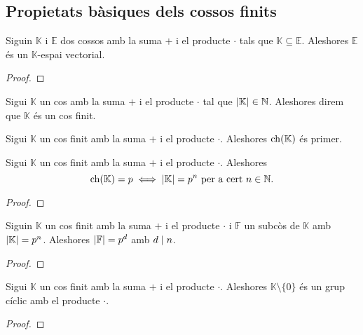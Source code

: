\documentclass[../Apunts.tex]{subfiles}
\begin{document}
	\subsection{Propietats bàsiques dels cossos finits}
	\begin{proposition}
		Siguin \(\mathbb{K}\) i \(\mathbb{E}\) dos cossos amb la suma \(+\) i el producte \(\cdot\) tals que \(\mathbb{K}\subseteq\mathbb{E}\). Aleshores \(\mathbb{E}\) és un \(\mathbb{K}\)-espai vectorial.
		\begin{proof}
		\end{proof}
	\end{proposition}
	\begin{definition}
		\label{def:cos finit}
		Sigui \(\mathbb{K}\) un cos amb la suma \(+\) i el producte \(\cdot\) tal que \(\abs{\mathbb{K}}\in\mathbb{N}\). Aleshores direm que \(\mathbb{K}\) és un cos finit.
	\end{definition}
	\begin{observation}
		Sigui \(\mathbb{K}\) un cos finit amb la suma \(+\) i el producte \(\cdot\). Aleshores \(\operatorname{ch}(\mathbb{K})\) és primer.
	\end{observation}
	\begin{theorem}
		Sigui \(\mathbb{K}\) un cos finit amb la suma \(+\) i el producte \(\cdot\). Aleshores
		\[\ch(\mathbb{K})=p\sii\abs{\mathbb{K}}=p^{n}\text{ per a cert }n\in\mathbb{N}.\]
		\begin{proof}
		\end{proof}
	\end{theorem}
	\begin{corollary}
		Siguin \(\mathbb{K}\) un cos finit amb la suma \(+\) i el producte \(\cdot\) i \(\mathbb{F}\) un subcòs de \(\mathbb{K}\) amb \(\abs{\mathbb{K}}=p^{n}\). Aleshores \(\abs{\mathbb{F}}=p^{d}\) amb \(d\mathrel{|} n\).
		\begin{proof}
		\end{proof}
	\end{corollary}
	\begin{theorem}
		\label{thm:teorema de l'element primitiu}
		Sigui \(\mathbb{K}\) un cos finit amb la suma \(+\) i el producte \(\cdot\). Aleshores \(\mathbb{K}\setminus\{0\}\) és un grup cíclic amb el producte \(\cdot\).
		\begin{proof}
		\end{proof}
	\end{theorem}
\end{document}
